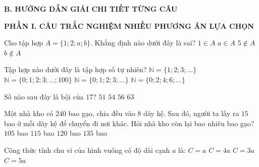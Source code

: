 \documentclass[12pt,a4paper]{article}
\begin{document}
\noindent\textbf{\large B. HƯỚNG DẪN GIẢI CHI TIẾT TỪNG CÂU}
\vspace{2mm}

\noindent\textbf{\large PHẦN I. CÂU TRẮC NGHIỆM NHIỀU PHƯƠNG ÁN LỰA CHỌN}
\vspace{1mm}
\begin{ex}
Cho tập hợp $A = \{1; 2; a; b\}$. Khẳng định nào dưới đây là sai?
\choice
{$1 \in A$}
{$a \in A$}
{$5 \notin A$}
{\True $b \notin A$}
\end{ex}

\begin{ex}
Tập hợp nào dưới đây là tập hợp số tự nhiên?
\choice
{$\mathbb{N} = \{1; 2; 3; \dots\}$}
{$\mathbb{N} = \{0; 1; 2; 3; \dots; 100\}$}
{\True $\mathbb{N} = \{0; 1; 2; 3; \dots\}$}
{$\mathbb{N} = \{0; 2; 4; 6; \dots\}$}
\end{ex}

\begin{ex}
Số nào sau đây là bội của $17$?
\choice
{\True $51$}
{$54$}
{$56$}
{$63$}
\end{ex}

\begin{ex}
Một nhà kho có $240$ bao gạo, chia đều vào $8$ dãy kệ. Sau đó, người ta lấy ra $15$ bao ở mỗi dãy kệ để chuyển đi nơi khác. Hỏi nhà kho còn lại bao nhiêu bao gạo?
\choice
{$105$ bao}
{$115$ bao}
{\True $120$ bao}
{$135$ bao}
\end{ex}

\begin{ex}
Công thức tính chu vi của hình vuông có độ dài cạnh $a$ là:
\choice
{$C = a$}
{\True $C = 4a$}
{$C = 3a$}
{$C = 5a$}
\end{ex}
\end{document}

